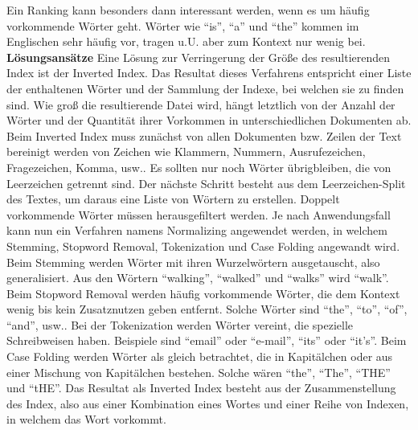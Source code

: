 \documentclass[
     11pt,         %
     a4paper,      %
     oneside,
     ]{article}
\begin{document}
\newline
Ein Ranking kann besonders dann interessant werden, wenn es um häufig vorkommende Wörter geht. Wörter wie “is”, “a” und “the” kommen im Englischen sehr häufig vor, tragen u.U. aber zum Kontext nur wenig bei.\newline
\newline
\textbf{Lösungsansätze}\newline
Eine Lösung zur Verringerung der Größe des resultierenden Index ist der Inverted Index. Das Resultat dieses Verfahrens entspricht einer Liste der enthaltenen Wörter und der Sammlung der Indexe, bei welchen sie zu finden sind. Wie groß die resultierende Datei wird, hängt letztlich von der Anzahl der Wörter und der Quantität ihrer Vorkommen in unterschiedlichen Dokumenten ab.\newline
\newline
Beim Inverted Index muss zunächst von allen Dokumenten bzw. Zeilen der Text bereinigt werden von Zeichen wie Klammern, Nummern, Ausrufezeichen, Fragezeichen, Komma, usw.. Es sollten nur noch Wörter übrigbleiben, die von Leerzeichen getrennt sind. Der nächste Schritt besteht aus dem Leerzeichen-Split des Textes, um daraus eine Liste von Wörtern zu erstellen. Doppelt vorkommende Wörter müssen herausgefiltert werden.\newline
\newline
Je nach Anwendungsfall kann nun ein Verfahren namens Normalizing angewendet werden, in welchem Stemming, Stopword Removal, Tokenization und Case Folding angewandt wird. Beim Stemming werden Wörter mit ihren Wurzelwörtern ausgetauscht, also generalisiert. Aus den Wörtern “walking”, “walked” und “walks” wird “walk”. Beim Stopword Removal werden häufig vorkommende Wörter, die dem Kontext wenig bis kein Zusatznutzen geben entfernt. Solche Wörter sind “the”, “to”, “of”, “and”, usw.. Bei der Tokenization werden Wörter vereint, die spezielle Schreibweisen haben. Beispiele sind “email” oder “e-mail”, “its” oder “it’s”. Beim Case Folding werden Wörter als gleich betrachtet, die in Kapitälchen oder aus einer Mischung von Kapitälchen bestehen. Solche wären “the”, “The”, “THE” und “tHE”.\newline
\newline
Das Resultat als Inverted Index besteht aus der Zusammenstellung des Index, also aus einer Kombination eines Wortes und einer Reihe von Indexen, in welchem das Wort vorkommt.\newline
\end{document}
